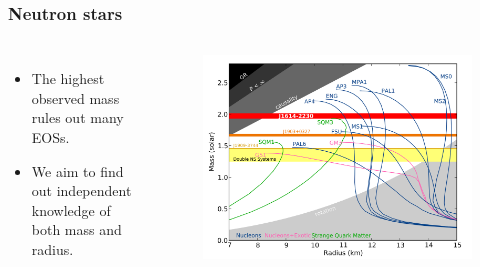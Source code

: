 \documentclass{beamer}
\begin{document}
\begin{frame}
\frametitle{Neutron stars}
\begin{columns}[c] %

\begin{itemize}
\item The highest observed mass rules out many EOSs.
\item We aim to find out independent knowledge of both mass and radius.
\end{itemize}


\begin{figure}
\includegraphics[width=1.1\linewidth]{eos_mr2.png}
\end{figure}

\end{columns}
\end{frame}
\end{document}
